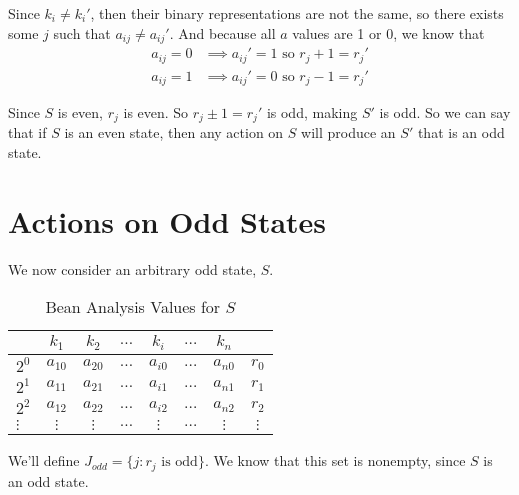 \documentclass[12pt]{article}
\begin{document}
Since $k_i \ne k_i'$, then their binary representations are not the same, so there exists some $j$ such that $a_{ij} \ne a_{ij}'$. And because all $a$ values are 1 or 0, we know that
\begin{align*}
    a_{ij}=0 &\implies a_{ij}'= 1 \text{ so } r_j + 1 = r_j' \\
    a_{ij}=1 &\implies a_{ij}'= 0 \text{ so } r_j - 1 = r_j'
\end{align*}

Since $S$ is even, $r_j$ is even. So $r_j \pm 1 = r_j'$ is odd, making $S'$ is odd. So we can say that if $S$ is an even state, then any action on $S$ will produce an $S'$ that is an odd state.

\newpage
\section{Actions on Odd States}
We now consider an arbitrary odd state, $S$. 


\begin{table}[h!]
    \centering
    \begin{tabular}{l|cccccc|c}
         & $k_1$ & $k_2$ & $\dots$  & $k_i$ & $\dots$& $k_n$ & \\
         \hline
        \cellcolor{white} $2^0$ & $a_{10}$ & $a_{20}$ & $\dots$ & $a_{i0}$ & $\dots$ & $a_{n0}$ & $r_0$ \\
        \cellcolor{white} $2^1$ & $a_{11}$ & $a_{21}$ & $\dots$ & $a_{i1}$ & $\dots$ & $a_{n1}$ & $r_1$ \\
        \cellcolor{white} $2^2$ & $a_{12}$ & $a_{22}$ & $\dots$ & $a_{i2}$ & $\dots$ & $a_{n2}$ & $r_2$ \\
        $\vdots$ & $\vdots$ & $\vdots$ & $\dots$ & $\vdots$ & $\dots$ & $\vdots$ & $\vdots$ \\
    \end{tabular}
    \caption{Bean Analysis Values for $S$}
    \label{table:peen}
\end{table}

We'll define $J_{odd} = \{j: r_j \text{ is odd}\}$. We know that this set is nonempty, since $S$ is an odd state. 
\end{document}
